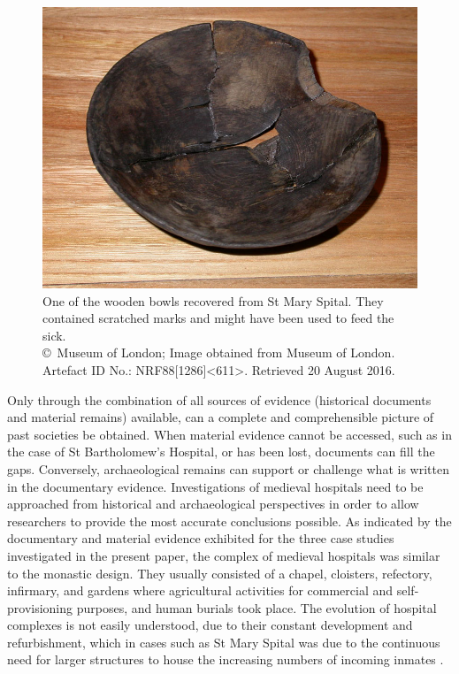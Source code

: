 \documentclass[%
	]{ijsra}
\begin{document}
	\begin{figure}
		\includegraphics[width=\linewidth]{figures/Pereda-Figure04}
		\caption{One of the wooden bowls recovered from St Mary Spital. They contained scratched marks and might have been used to feed the sick.
		{\normalfont\scriptsize \\ \copyright\ Museum of London; Image obtained from Museum of London. Artefact ID No.: NRF88[1286]<611>. Retrieved 20 August 2016.}}
	\label{fig:Pereda-Figure04}
\end{figure}
\IJSRAseparator
{}
Only through the combination of all sources of evidence (historical documents and material remains) available, can a complete and comprehensible picture of past societies be obtained. When material evidence cannot be accessed, such as in the case of St Bartholomew’s Hospital, or has been lost, documents can fill the gaps. Conversely, archaeological remains can support or challenge what is written in the documentary evidence. Investigations of medieval hospitals need to be approached from historical and archaeological perspectives in order to allow researchers to provide the most accurate conclusions possible. 
As indicated by the documentary and material evidence exhibited for the three case studies investigated in the present paper, the complex of medieval hospitals was similar to the monastic design. They usually consisted of a chapel, cloisters, refectory, infirmary, and gardens where agricultural activities for commercial and self-provisioning purposes, and human burials took place. 
The evolution of hospital complexes is not easily understood, due to their constant development and refurbishment, which in cases such as St Mary Spital was due to the continuous need for larger structures to house the increasing numbers of incoming inmates \parencites[69,117-118]{Henderson_2006}[27]{Malcom_2014}[41,43]{Orme_1995}[35]{Rawcliffe_1999}.
\end{document}

